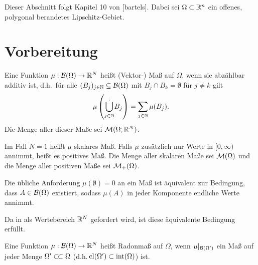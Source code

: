 %

Dieser Abschnitt folgt Kapitel 10 von [bartels].
Dabei sei $\Omega \subset \mathbb{R}^n$ ein offenes, polygonal berandetes
Lipschitz-Gebiet.

\section{Vorbereitung}

\begin{definition}[braides]\label{def:masz}
  Eine Funktion $\mu:\mathcal{B}(\Omega)\to\mathbb{R}^N$ heißt (Vektor-) Maß auf $\Omega$,
  wenn sie abzählbar additiv ist, d.h.\ für alle
  $(B_j)_{j\in\mathbb{N}}\subseteq\mathcal{B}(\Omega)$ mit $B_j \cap B_k = \emptyset$ für
  $j\neq k$ gilt
  \begin{align*}
    \mu\left( \dot{\bigcup_{j\in\mathbb{N}}} B_j  \right) = \sum_{j\in\mathbb{N}} \mu(B_j).
  \end{align*}
  Die Menge aller dieser Maße sei $\mathcal{M}(\Omega;\mathbb{R}^N)$.

  Im Fall $N=1$ heißt $\mu$ skalares Maß. Falls $\mu$ zusätzlich nur Werte in 
  $[0,\infty)$
  annimmt, heißt es positives Maß. Die Menge aller skalaren Maße sei 
  $\mathcal{M}(\Omega)$ und die Menge aller positiven Maße sei 
  $\mathcal{M}_+(\Omega)$.
\end{definition}

\begin{remark}
  Die übliche Anforderung $\mu(\emptyset) = 0$  an ein Maß ist äquivalent zur 
  Bedingung, dass $A\in \mathcal{B}(\Omega)$ existiert, sodass $\mu(A)$ in jeder 
  Komponente endliche Werte annimmt. 

  Da in  als Wertebereich $\mathbb{R}^N$ gefordert wird, ist
  diese äquivalente Bedingung erfüllt.
\end{remark}

\begin{definition}\label{def:radonmasz}
  Eine Funktion $\mu:\mathcal{B}(\Omega)\to\mathbb{R}^N$ heißt Radonmaß auf 
  $\Omega$, wenn $\mu|_{\mathcal{B}(\Omega')}$ ein Maß auf jeder Menge 
  $\Omega'\ssubset \Omega$ (d.h.\,$\operatorname{cl}({\Omega'})\subset \operatorname{int}({\Omega})$) 
  ist.
\end{definition}


